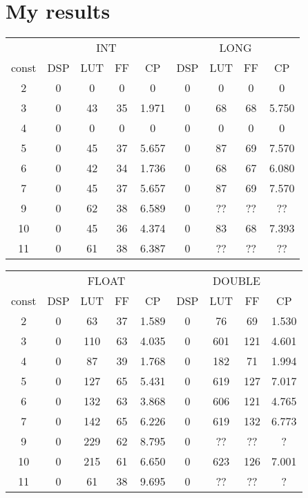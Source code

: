 \documentclass[10pt,a4paper,twoside]{article}
\author{Victor Lezaud}
\title{}
\begin{document}
\section{My results}
\begin{tabular}{|c||c|c|c|c|c|c|c|c|}
    \hline
     & \multicolumn{4}{|c}{INT} & \multicolumn{4}{|c||}{LONG}\\
    const & DSP & LUT & FF & CP & DSP & LUT & FF & CP \\
    \hline
    2 & 0 & 0 & 0 & 0 & 0 & 0 & 0 & 0 \\
    \hline
    3 & 0 & 43 & 35 & 1.971 & 0 & 68 & 68 & 5.750 \\
    \hline
    4 & 0 & 0 & 0 & 0 & 0 & 0 & 0 & 0 \\
    \hline
    5 & 0 & 45 & 37 & 5.657 & 0 & 87 & 69 & 7.570 \\
    \hline
    6 & 0 & 42 & 34 & 1.736 & 0 & 68 & 67 & 6.080 \\
    \hline
    7 & 0 & 45 & 37 & 5.657 & 0 & 87 & 69 & 7.570 \\
    \hline
    9 & 0 & 62 & 38 & 6.589 & 0 & ?? & ?? & ?? \\
    \hline
    10 & 0 & 45 & 36 & 4.374 & 0 & 83 & 68 & 7.393 \\
    \hline
    11 & 0 & 61 & 38 & 6.387 & 0 & ?? & ?? & ?? \\
    \hline
\end{tabular}

\begin{tabular}{|c||c|c|c|c|c|c|c|c|}
    \hline
     & \multicolumn{4}{|c|}{FLOAT} &  \multicolumn{4}{|c|}{DOUBLE}\\
    const & DSP & LUT & FF & CP & DSP & LUT & FF & CP \\
    \hline
    2 & 0 & 63 & 37 & 1.589 & 0 & 76 & 69 & 1.530 \\
    \hline
    3 & 0 & 110 & 63 & 4.035 & 0 & 601 & 121 & 4.601 \\
    \hline
    4 & 0 & 87 & 39 & 1.768 & 0 & 182 & 71 & 1.994 \\
    \hline
    5 & 0 & 127 & 65 & 5.431 & 0 & 619 & 127 & 7.017 \\
    \hline
    6 & 0 & 132 & 63 & 3.868 & 0 & 606 & 121 & 4.765 \\
    \hline
    7 & 0 & 142 & 65 & 6.226 & 0 & 619 & 132 & 6.773 \\
    \hline
    9 & 0 & 229 & 62 & 8.795 & 0 &  ?? & ?? & ? \\
    \hline
    10 & 0 & 215 & 61 & 6.650 & 0 & 623 & 126 & 7.001 \\
    \hline
    11 & 0 & 61 & 38 & 9.695 & 0 & ?? & ?? & ? \\
    \hline
\end{tabular}
\end{document}
